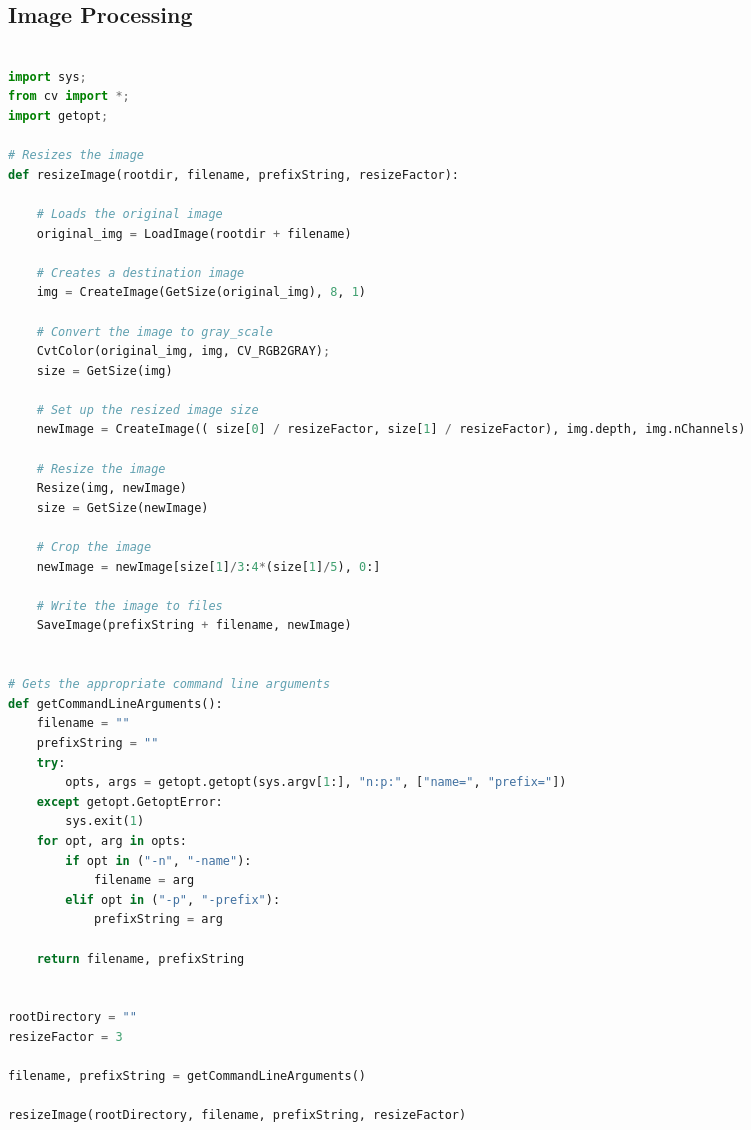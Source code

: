 \documentclass[11pt, oneside, fullpage, doublespace]{article}
\begin{document}
\subsection*{Image Processing}
\begin{spacing}{1}
\begin{lstlisting}[language=python]

import sys;
from cv import *;
import getopt;

# Resizes the image
def resizeImage(rootdir, filename, prefixString, resizeFactor):

    # Loads the original image
    original_img = LoadImage(rootdir + filename)

    # Creates a destination image
    img = CreateImage(GetSize(original_img), 8, 1)

    # Convert the image to gray_scale
    CvtColor(original_img, img, CV_RGB2GRAY);
    size = GetSize(img)

    # Set up the resized image size
    newImage = CreateImage(( size[0] / resizeFactor, size[1] / resizeFactor), img.depth, img.nChannels)

    # Resize the image
    Resize(img, newImage)
    size = GetSize(newImage)

    # Crop the image
    newImage = newImage[size[1]/3:4*(size[1]/5), 0:]

    # Write the image to files
    SaveImage(prefixString + filename, newImage)


# Gets the appropriate command line arguments
def getCommandLineArguments():
    filename = ""
    prefixString = ""
    try:
        opts, args = getopt.getopt(sys.argv[1:], "n:p:", ["name=", "prefix="])
    except getopt.GetoptError:
        sys.exit(1)
    for opt, arg in opts:
        if opt in ("-n", "-name"):
            filename = arg
        elif opt in ("-p", "-prefix"):
            prefixString = arg

    return filename, prefixString
    
           
rootDirectory = ""
resizeFactor = 3

filename, prefixString = getCommandLineArguments()

resizeImage(rootDirectory, filename, prefixString, resizeFactor)
\end{lstlisting}
\end{spacing}
\end{document}
